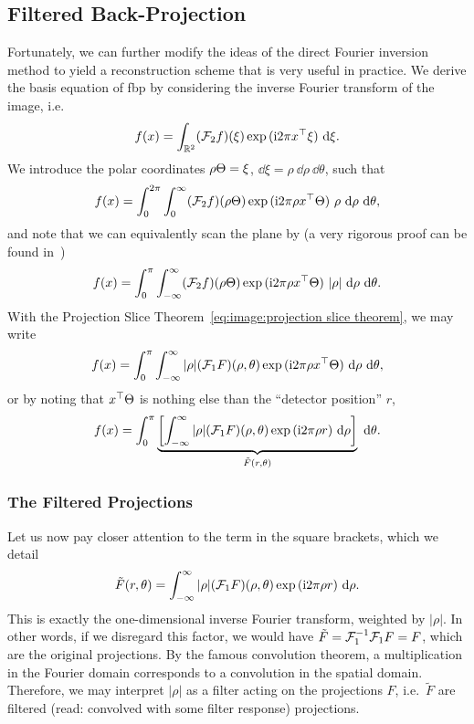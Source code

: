 \documentclass[../ml-ct.tex]{subfiles}
\begin{document}
\subsection{Filtered Back-Projection}
Fortunately, we can further modify the ideas of the direct Fourier inversion method to yield a reconstruction scheme that is very useful in practice.
We derive the basis equation of \gls{fbp} by considering the inverse Fourier transform of the image, i.e.
\begin{equation}
	f(x) = \int_{\mathbb{R}^2} (\mathcal{F}_2 f)(\xi) \exp{(\mathrm{i}2\pi x^\top\xi)}\ \mathrm{d} \xi.
\end{equation}
We introduce the polar coordinates \( \rho\Theta = \xi \), \( \dd \xi = \rho\ \dd \rho\ \dd \theta \), such that
\begin{equation}
	f(x) = \int_{0}^{2\pi} \int_{0}^{\infty} (\mathcal{F}_2 f)(\rho\Theta) \exp{(\mathrm{i}2\pi \rho x^\top\Theta)}\ \rho\ \mathrm{d} \rho\ \mathrm{d} \theta,
\end{equation}
and note that we can equivalently scan the plane by (a very rigorous proof can be found in~\cite{buzug_computed_2008})
\begin{equation}
	f(x) = \int_{0}^{\pi} \int_{-\infty}^{\infty} (\mathcal{F}_2 f)(\rho\Theta) \exp{(\mathrm{i}2\pi \rho x^\top\Theta)}\ |\rho|\ \mathrm{d} \rho\ \mathrm{d} \theta.
\end{equation}
With the Projection Slice Theorem~\cref{eq:image:projection slice theorem}, we may write
\begin{equation}
	f(x) = \int_{0}^{\pi} \int_{-\infty}^{\infty} |\rho| (\mathcal{F}_1 F)(\rho, \theta) \exp{(\mathrm{i}2\pi \rho x^\top\Theta)}\ \mathrm{d} \rho\ \mathrm{d} \theta,
\end{equation}
or by noting that \( x^\top\Theta \) is nothing else than the \enquote{detector position} \( r \),
\begin{equation}
	f(x) = \int_{0}^{\pi} \underbrace{\left[\int_{-\infty}^{\infty} |\rho| (\Fourier F)(\rho, \theta) \exp{(\imagi 2\pi \rho r)}\ \dd \rho\right]}_{\tilde{F}(r, \theta)}\ \dd \theta.%
	\label{eq:image:filtered backprojection}
\end{equation}
\subsubsection{The Filtered Projections}
Let us now pay closer attention to the term in the square brackets, which we detail
\begin{equation}
	\tilde{F}(r, \theta) = \int_{-\infty}^{\infty} |\rho| (\mathcal{F}_1 F)(\rho, \theta) \exp{(\mathrm{i}2\pi \rho r)}\ \mathrm{d} \rho.
\end{equation}
This is exactly the one-dimensional inverse Fourier transform, weighted by \( |\rho| \).
In other words, if we disregard this factor, we would have \( \tilde{F} = \mathcal{F}_1^{-1} \mathcal{F}_1 F = F \), which are the original projections.
By the famous convolution theorem, a multiplication in the Fourier domain corresponds to a convolution in the spatial domain.
Therefore, we may interpret \( |\rho| \) as a filter acting on the projections \( F \), i.e.\ \( \tilde{F} \) are filtered (read: convolved with some filter response) projections.
\end{document}
